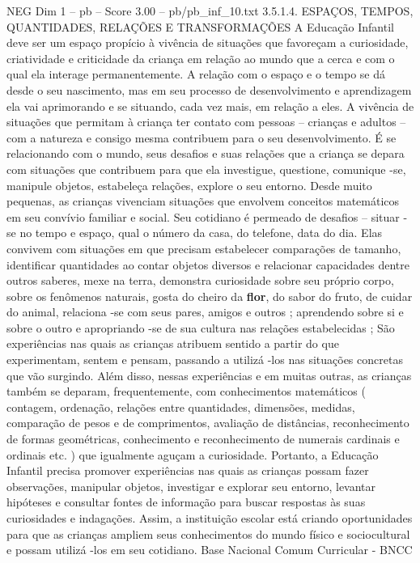 \begin{textsample}{NEG Dim 1 – pb – Score 3.00 – pb/pb\_inf\_10.txt}  \label{ex:f1_neg_149}
3.5.1.4.
ESPAÇOS, TEMPOS, QUANTIDADES, RELAÇÕES E TRANSFORMAÇÕES A Educação Infantil deve ser um espaço propício à vivência de situações que favoreçam a curiosidade, criatividade e criticidade da criança em relação ao mundo que a cerca e com o qual ela interage permanentemente.
A relação com o espaço e o tempo se dá desde o seu nascimento, mas em seu processo de desenvolvimento e aprendizagem ela vai aprimorando e se situando, cada vez mais, em relação a eles.
A vivência de situações que permitam à criança ter contato com pessoas – crianças e adultos – com a natureza e consigo mesma contribuem para o seu desenvolvimento.
É se relacionando com o mundo, seus desafios e suas relações que a criança se depara com situações que contribuem para que ela investigue, questione, comunique -se, manipule objetos, estabeleça relações, explore o seu entorno.
Desde muito pequenas, as crianças vivenciam situações que envolvem conceitos matemáticos em seu convívio familiar e social.
Seu cotidiano é permeado de desafios – situar -se no tempo e espaço, qual o número da casa, do telefone, data do dia.
Elas convivem com situações em que precisam estabelecer comparações de tamanho, identificar quantidades ao contar objetos diversos e relacionar capacidades dentre outros saberes, mexe na terra, demonstra curiosidade sobre seu próprio corpo, sobre os fenômenos naturais, gosta do cheiro da \textbf{flor}, do sabor do fruto, de cuidar do animal, relaciona -se com seus pares, amigos e outros ; aprendendo sobre si e sobre o outro e apropriando -se de sua cultura nas relações estabelecidas ; São experiências nas quais as crianças atribuem sentido a partir do que experimentam, sentem e pensam, passando a utilizá -los nas situações concretas que vão surgindo.
Além disso, nessas experiências e em muitas outras, as crianças também se deparam, frequentemente, com conhecimentos matemáticos ( contagem, ordenação, relações entre quantidades, dimensões, medidas, comparação de pesos e de comprimentos, avaliação de distâncias, reconhecimento de formas geométricas, conhecimento e reconhecimento de numerais cardinais e ordinais etc. ) que igualmente aguçam a curiosidade.
Portanto, a Educação Infantil precisa promover experiências nas quais as crianças possam fazer observações, manipular objetos, investigar e explorar seu entorno, levantar hipóteses e consultar fontes de informação para buscar respostas às suas curiosidades e indagações.
Assim, a instituição escolar está criando oportunidades para que as crianças ampliem seus conhecimentos do mundo físico e sociocultural e possam utilizá -los em seu cotidiano.
Base Nacional Comum Curricular - BNCC

\end{textsample}
